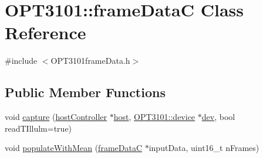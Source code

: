 \hypertarget{class_o_p_t3101_1_1frame_data_c}{}\section{O\+P\+T3101\+:\+:frame\+DataC Class Reference}
\label{class_o_p_t3101_1_1frame_data_c}


{\ttfamily \#include $<$O\+P\+T3101frame\+Data.\+h$>$}

\subsection*{Public Member Functions}
\begin{DoxyCompactItemize}
\item 
void \mbox{\hyperlink{class_o_p_t3101_1_1frame_data_c_a01b508409579d9d47bd55080a498146d}{capture}} (\mbox{\hyperlink{classhost_controller}{host\+Controller}} $\ast$\mbox{\hyperlink{register_8h_a47f8cbf152e48aa4fdb624be57a9a856}{host}}, \mbox{\hyperlink{class_o_p_t3101_1_1device}{O\+P\+T3101\+::device}} $\ast$\mbox{\hyperlink{main_8cpp_ae89da95486821d0a26b9592cd8891276}{dev}}, bool read\+T\+Illulm=true)
\item 
void \mbox{\hyperlink{class_o_p_t3101_1_1frame_data_c_a30c7f8d67291f2fd8a82a79da5d4a8bf}{populate\+With\+Mean}} (\mbox{\hyperlink{class_o_p_t3101_1_1frame_data_c}{frame\+DataC}} $\ast$input\+Data, uint16\+\_\+t n\+Frames)
\end{DoxyCompactItemize}
